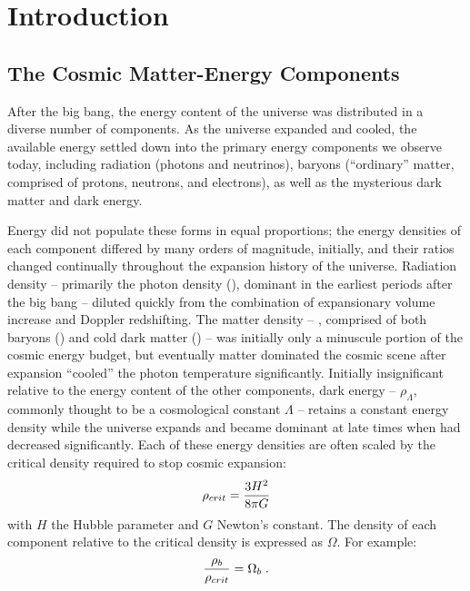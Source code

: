
\chapter{Introduction}
\label{chap:Intro}
\section{The Cosmic Matter-Energy Components}
\label{sec:Intro.Components}
After the big bang, the energy content of the universe was distributed
in a diverse number of components. As the universe expanded and
cooled, the available energy settled down into the primary energy
components we observe today, including radiation (photons and
neutrinos), baryons (``ordinary'' matter, comprised of protons,
neutrons, and electrons), as well as the mysterious dark matter and
dark energy.

Energy did not populate these forms in equal proportions; the energy
densities of each component differed by many orders of magnitude,
initially, and their ratios changed continually throughout the
expansion history of the universe. Radiation density -- primarily the
photon density (\rhog), dominant in the earliest periods after the big
bang -- diluted quickly from the combination of expansionary volume
increase and Doppler redshifting. The matter density -- \rhom,
comprised of both baryons (\rhob) and cold dark matter (\rhoc) -- was
initially only a minuscule portion of the cosmic energy budget, but
eventually matter dominated the cosmic scene after expansion
``cooled'' the photon temperature significantly. Initially
insignificant relative to the energy content of the other components,
dark energy -- $\rho_\Lambda$, commonly thought to be a cosmological
constant $\Lambda$ -- retains a constant energy density while the
universe expands and became dominant at late times when \rhom{} had
decreased significantly. Each of these energy densities are often
scaled by the critical density required to stop cosmic expansion:
\begin{equation}
\rho_{crit} = \frac{3H^2}{8\pi{}G} 
\end{equation}
with $H$ the Hubble parameter and $G$ Newton's constant. The density of each component relative to the critical
density is expressed as $\Omega$. For example:
\begin{equation}
\frac{\rho_b}{\rho_{crit}} = \Omega_b\;.
\end{equation}


